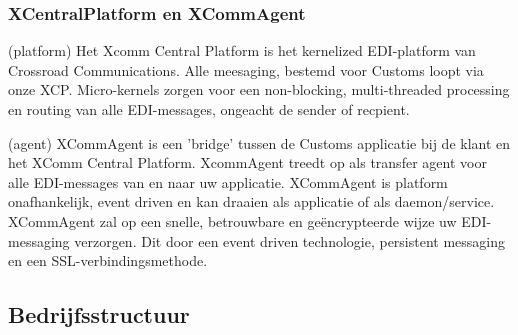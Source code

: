 \subsubsection {XCentralPlatform en XCommAgent}

(platform) Het Xcomm Central Platform is het kernelized EDI-platform van Crossroad
Communications.
Alle meesaging, bestemd voor Customs loopt via onze XCP.
Micro-kernels zorgen voor een non-blocking, multi-threaded processing en routing van alle
EDI-messages, ongeacht de sender of recpient.

(agent) XCommAgent is een 'bridge' tussen de Customs applicatie bij de klant en het XComm
Central Platform. XcommAgent treedt op als transfer agent voor alle EDI-messages van en
naar uw applicatie.
XCommAgent is platform onafhankelijk, event driven en kan draaien als applicatie of als
daemon/service.
XCommAgent zal op een snelle, betrouwbare en geëncrypteerde wijze uw EDI-messaging
verzorgen. Dit door een event driven technologie, persistent messaging en een
SSL-verbindingsmethode.


\subsection {Bedrijfsstructuur}

